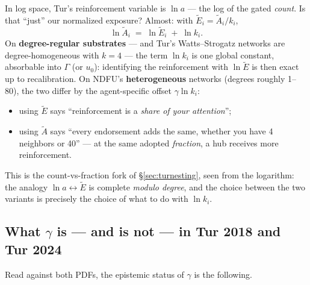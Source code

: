 \documentclass[11pt,a4paper]{article}
\newcommand{\Ee}{\tilde{E}}                 %
\newcommand{\Acount}{\tilde{A}}             %
\begin{document}
In log space, Tur's reinforcement variable is $\ln a$ --- the log of the gated
\emph{count}. Is that ``just'' our normalized exposure? Almost: with
$\Ee_i = \Acount_i / k_i$,
\begin{equation}
  \ln \Acount_i \;=\; \ln \Ee_i \;+\; \ln k_i .
  \label{eq:logdecomp}
\end{equation}
On \textbf{degree-regular substrates} --- and Tur's Watts--Strogatz networks are
degree-homogeneous with $k = 4$ --- the term $\ln k_i$ is one global constant, absorbable
into $\Gamma$ (or $u_0$): identifying the reinforcement with $\ln \Ee$ is then exact up
to recalibration. On NDFU's \textbf{heterogeneous} networks (degrees roughly 1--80), the
two differ by the agent-specific offset $\gamma \ln k_i$:
\begin{itemize}
  \item using $\Ee$ says ``reinforcement is a \emph{share of your attention}'';
  \item using $\Acount$ says ``every endorsement adds the same, whether you have 4
    neighbors or 40'' --- at the same adopted \emph{fraction}, a hub receives more
    reinforcement.
\end{itemize}
This is the count-vs-fraction fork of \S\ref{sec:turnesting}, seen from the logarithm:
the analogy $\ln a \leftrightarrow \Ee$ is complete \emph{modulo degree}, and the choice
between the two variants is precisely the choice of what to do with $\ln k_i$.

\subsection{What $\gamma$ is --- and is not --- in Tur 2018 and Tur 2024}
\label{sec:gammastatus}

Read against both PDFs, the epistemic status of $\gamma$ is the following.
\end{document}
